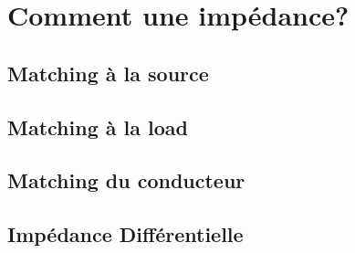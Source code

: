 
\section{Comment une impédance?}

\subsection{Matching à la source}
\subsection{Matching à la load}
\subsection{Matching du conducteur}
\subsection{Impédance Différentielle}